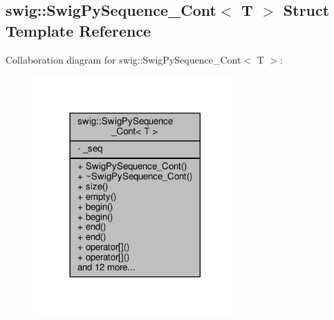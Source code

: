 \subsection{swig\+:\+:Swig\+Py\+Sequence\+\_\+\+Cont$<$ T $>$ Struct Template Reference}
\label{structswig_1_1SwigPySequence__Cont}


Collaboration diagram for swig\+:\+:Swig\+Py\+Sequence\+\_\+\+Cont$<$ T $>$\+:
\nopagebreak
\begin{figure}[H]
\begin{center}
\leavevmode
\includegraphics[width=221pt]{dd/d99/structswig_1_1SwigPySequence__Cont__coll__graph}
\end{center}
\end{figure}
